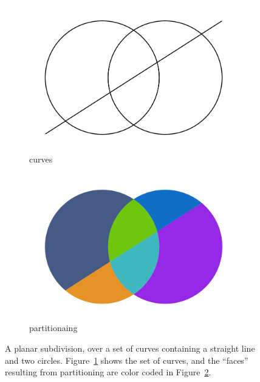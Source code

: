 \begin{figure}%
  \centering
  \begin{subfigure}{.4\textwidth}
    \includegraphics[width=\textwidth]{figures/intro_curves2.png}
    \caption{curves} \label{subfig:intro_curves2}
  \end{subfigure}%
  \quad \quad \quad%
  \begin{subfigure}{.4\textwidth}
    \includegraphics[width=\textwidth]{figures/intro_partitioning2.png}
    \caption{partitionaing} \label{subfig:intro_partitioning2}
  \end{subfigure}%
  \caption[xxx]
          {A planar subdivision, over a set of curves containing a straight line and two circles.
          Figure~\ref{subfig:intro_curves2} shows the set of curves, and the ``faces'' resulting from partitioning are color coded in Figure~\ref{subfig:intro_partitioning2}.}
  \label{fig:intro_curvesPartitioning2}
\end{figure}

